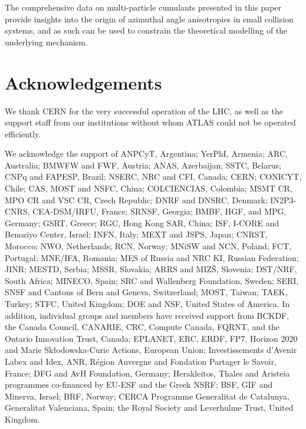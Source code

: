\documentclass[cernpreprint,texlive=2014,txfonts,UKenglish]{latex/atlasdoc}
\begin{document}
The comprehensive data on multi-particle cumulants presented in this paper provide insights into the origin of azimuthal angle anisotropies in small collision systems, and as such can be used to constrain the theoretical modelling of the underlying mechanism. 
\section*{Acknowledgements}

We thank CERN for the very successful operation of the LHC, as well as the
support staff from our institutions without whom ATLAS could not be
operated efficiently.

We acknowledge the support of ANPCyT, Argentina; YerPhI, Armenia; ARC, Australia; BMWFW and FWF, Austria; ANAS, Azerbaijan; SSTC, Belarus; CNPq and FAPESP, Brazil; NSERC, NRC and CFI, Canada; CERN; CONICYT, Chile; CAS, MOST and NSFC, China; COLCIENCIAS, Colombia; MSMT CR, MPO CR and VSC CR, Czech Republic; DNRF and DNSRC, Denmark; IN2P3-CNRS, CEA-DSM/IRFU, France; SRNSF, Georgia; BMBF, HGF, and MPG, Germany; GSRT, Greece; RGC, Hong Kong SAR, China; ISF, I-CORE and Benoziyo Center, Israel; INFN, Italy; MEXT and JSPS, Japan; CNRST, Morocco; NWO, Netherlands; RCN, Norway; MNiSW and NCN, Poland; FCT, Portugal; MNE/IFA, Romania; MES of Russia and NRC KI, Russian Federation; JINR; MESTD, Serbia; MSSR, Slovakia; ARRS and MIZ\v{S}, Slovenia; DST/NRF, South Africa; MINECO, Spain; SRC and Wallenberg Foundation, Sweden; SERI, SNSF and Cantons of Bern and Geneva, Switzerland; MOST, Taiwan; TAEK, Turkey; STFC, United Kingdom; DOE and NSF, United States of America. In addition, individual groups and members have received support from BCKDF, the Canada Council, CANARIE, CRC, Compute Canada, FQRNT, and the Ontario Innovation Trust, Canada; EPLANET, ERC, ERDF, FP7, Horizon 2020 and Marie Sk{\l}odowska-Curie Actions, European Union; Investissements d'Avenir Labex and Idex, ANR, R{\'e}gion Auvergne and Fondation Partager le Savoir, France; DFG and AvH Foundation, Germany; Herakleitos, Thales and Aristeia programmes co-financed by EU-ESF and the Greek NSRF; BSF, GIF and Minerva, Israel; BRF, Norway; CERCA Programme Generalitat de Catalunya, Generalitat Valenciana, Spain; the Royal Society and Leverhulme Trust, United Kingdom.
\end{document}
